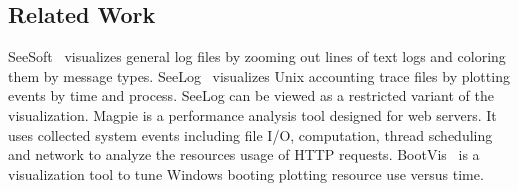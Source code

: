 \subsection{Related Work}
\label{sec:related}




SeeSoft~\cite{eick1994graphical} visualizes general log files by zooming out
lines of text logs and coloring them by message types.
SeeLog~\cite{eick1996displaying} visualizes Unix accounting trace files by
plotting events by time and process.
SeeLog can be viewed as a restricted variant of the
\VDP{} visualization.
Magpie \cite{barham2004using} is a performance analysis tool designed for web servers.
It uses collected system events including file I/O, computation,
thread scheduling and network to analyze the resources usage of
HTTP requests.
BootVis~\cite{bootvis} 
is a visualization tool to tune
Windows booting plotting resource use versus time.

